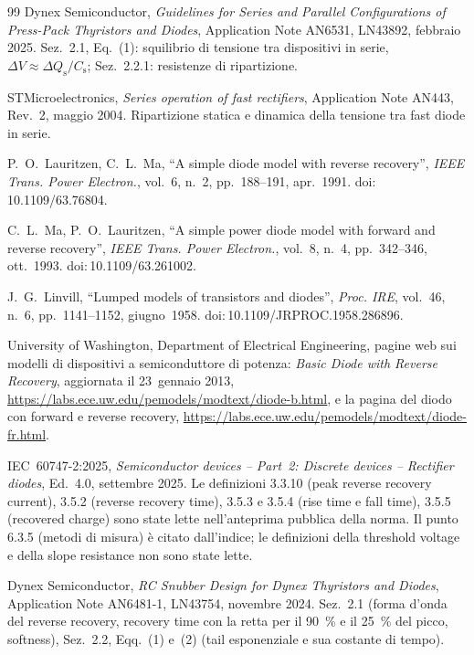 \documentclass[10pt,a4paper]{scrartcl}
\begin{document}
\begin{thebibliography}{99}
Dynex Semiconductor, \emph{Guidelines for Series and Parallel Configurations of Press-Pack Thyristors and Diodes}, Application Note AN6531, LN43892, febbraio 2025. Sez.~2.1, Eq.~(1): squilibrio di tensione tra dispositivi in serie, $\Delta V \approx \Delta Q_\mathrm{s}/C_\mathrm{s}$; Sez.~2.2.1: resistenze di ripartizione.

STMicroelectronics, \emph{Series operation of fast rectifiers}, Application Note AN443, Rev.~2, maggio 2004. Ripartizione statica e dinamica della tensione tra fast diode in serie.

P.~O.~Lauritzen, C.~L.~Ma, ``A simple diode model with reverse recovery'', \emph{IEEE Trans. Power Electron.}, vol.~6, n.~2, pp.~188--191, apr.~1991. doi:\,10.1109/63.76804.

C.~L.~Ma, P.~O.~Lauritzen, ``A simple power diode model with forward and reverse recovery'', \emph{IEEE Trans. Power Electron.}, vol.~8, n.~4, pp.~342--346, ott.~1993. doi:\,10.1109/63.261002.

J.~G.~Linvill, ``Lumped models of transistors and diodes'', \emph{Proc. IRE}, vol.~46, n.~6, pp.~1141--1152, giugno~1958. doi:\,10.1109/JRPROC.1958.286896.

University of Washington, Department of Electrical Engineering, pagine web sui modelli di dispositivi a semiconduttore di potenza: \emph{Basic Diode with Reverse Recovery}, aggiornata il 23~gennaio 2013, \url{https://labs.ece.uw.edu/pemodels/modtext/diode-b.html}, e la pagina del diodo con forward e reverse recovery, \url{https://labs.ece.uw.edu/pemodels/modtext/diode-fr.html}.

IEC~60747-2:2025, \emph{Semiconductor devices -- Part~2: Discrete devices -- Rectifier diodes}, Ed.~4.0, settembre 2025. Le definizioni 3.3.10 (peak reverse recovery current), 3.5.2 (reverse recovery time), 3.5.3 e 3.5.4 (rise time e fall time), 3.5.5 (recovered charge) sono state lette nell'anteprima pubblica della norma. Il punto 6.3.5 (metodi di misura) è citato dall'indice; le definizioni della threshold voltage e della slope resistance non sono state lette.

Dynex Semiconductor, \emph{RC Snubber Design for Dynex Thyristors and Diodes}, Application Note AN6481-1, LN43754, novembre 2024. Sez.~2.1 (forma d'onda del reverse recovery, recovery time con la retta per il \SI{90}{\percent} e il \SI{25}{\percent} del picco, softness), Sez.~2.2, Eqq.~(1) e~(2) (tail esponenziale e sua costante di tempo).


\end{thebibliography}
\end{document}
